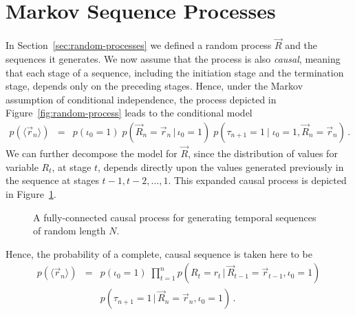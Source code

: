 \documentclass[a4paper]{article}
\begin{document}
\section{Markov Sequence Processes}
\label{sec:markov-processes}
In Section~\ref{sec:random-processes} we defined a random process $\vec{R}$ and the sequences it generates.
We now assume that the process is also {\em causal}, meaning that each stage of a sequence,
including the initiation stage and the termination stage, depends only on the preceding stages.
Hence, under the Markov assumption of conditional independence,
the process depicted in Figure~\ref{fig:random-process} leads to the conditional model
\begin{eqnarray}
\!\!\!\!\!\!p(\langle\vec{r}_n\rangle)
&\!\!=\!\!& p(\iota_0=1)\;p(\vec{R}_n=\vec{r}_n\,|\,\iota_0=1)\;
p(\tau_{n+1}=1\:|\;\iota_0=1,\vec{R}_n=\vec{r}_n)
\,.
\end{eqnarray}
We can further decompose the model for $\vec{R}$, since the distribution of
values for variable $R_t$, at stage $t$, depends directly upon the values generated previously
in the sequence at stages $t-1,t-2,\ldots,1$. 
This expanded causal process is depicted in Figure~\ref{fig:causal-process}.
\begin{figure}[hbt]
\centering
{}
\caption{A fully-connected causal process for generating temporal sequences of random length $N$.}
\label{fig:causal-process}
\end{figure}
Hence, the probability of a complete, causal sequence is taken here to be
\begin{eqnarray}
p(\langle\vec{r}_{n}\rangle)
& = & 
p(\iota_0=1)\;
\prod_{t=1}^{n}
p(R_t=r_t\,|\,\vec{R}_{t-1}=\vec{r}_{t-1},\iota_0=1)
\nonumber\\&&
p(\tau_{n+1}=1\,|\,\vec{R}_{n}=\vec{r}_{n},\iota_0=1)
\,.
\label{eq:temporal-model}
\end{eqnarray}
\end{document}
